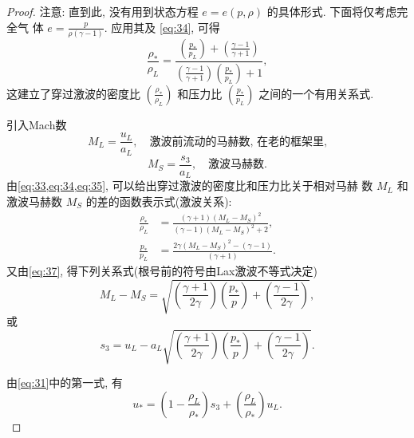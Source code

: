 \documentclass[12pt]{article}
\begin{document}
\begin{proof}
	注意: 直到此, 没有用到状态方程 $e=e(p, \rho)$ 的具体形式. 下面将仅考虑完全气 体 $e=\frac{p}{\rho(\gamma-1)} .$ 应用其及 \cref{eq:34}, 可得
	\begin{equation}
		\frac{\rho_{*}}{\rho_{L}}=\frac{\left(\frac{p_{*}}{p_{L}}\right)+\left(\frac{\gamma-1}{\gamma+1}\right)}{\left(\frac{\gamma-1}{\gamma+1}\right)\left(\frac{p_{*}}{p_{L}}\right)+1},
		\label{eq:35}
	\end{equation}
	这建立了穿过激波的密度比 $\left(\frac{\rho_{*}}{\rho_{L}}\right)$ 和压力比 $\left(\frac{p_{*}}{p_{L}}\right)$ 之间的一个有用关系式.


	引入Mach数
	\begin{equation}
		M_{L}=\frac{u_{L}}{a_{L}}, \quad \text{激波前流动的马赫数, 在老的框架里,}
	\end{equation}
	\begin{equation}
		M_{S}=\frac{s_{3}}{a_{L}}, \quad \text{激波马赫数.}
		\label{eq:36}
	\end{equation}
	由\cref{eq:33,eq:34,eq:35}, 可以给出穿过激波的密度比和压力比关于相对马赫 数 $M_{L}$ 和激波马赫数 $M_{S}$ 的差的函数表示式(激波关系):
	\begin{align}
		\frac{\rho_{*}}{\rho_{L}} & =\frac{(\gamma+1)\left(M_{L}-M_{S}\right)^{2}}{(\gamma-1)\left(M_{L}-M_{S}\right)^{2}+2}, \\
		\frac{p_{*}}{p_{L}}       & =\frac{2 \gamma\left(M_{L}-M_{S}\right)^{2}-(\gamma-1)}{(\gamma+1)}.
		\label{eq:37}
	\end{align}
	又由\cref{eq:37}, 得下列关系式(根号前的符号由Lax激波不等式决定)
	\begin{equation}
		M_{L}-M_{S}=\sqrt{\left(\frac{\gamma+1}{2 \gamma}\right)\left(\frac{p_{*}}{p}\right)+\left(\frac{\gamma-1}{2 \gamma}\right)},
	\end{equation}
	或
	\begin{equation}
		s_{3}=u_{L}-a_{L} \sqrt{\left(\frac{\gamma+1}{2 \gamma}\right)\left(\frac{p_{*}}{p}\right)+\left(\frac{\gamma-1}{2 \gamma}\right)} .
	\end{equation}

	由\cref{eq:31}中的第一式, 有
	\begin{equation}
		u_{*}=\left(1-\frac{\rho_{L}}{\rho_{*}}\right) s_{3}+\left(\frac{\rho_{L}}{\rho_{*}}\right) u_{L}.
	\end{equation}


\end{proof}
\end{document}
